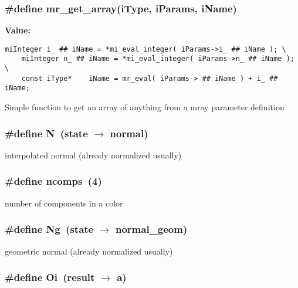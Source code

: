 \subsubsection{\setlength{\rightskip}{0pt plus 5cm}\#define mr\_\-get\_\-array(i\-Type, i\-Params, i\-Name)}\label{mrRman__macros_8h_a15}


{\bf Value:}

\footnotesize\begin{verbatim}miInteger i_ ## iName = *mi_eval_integer( iParams->i_ ## iName ); \
    miInteger n_ ## iName = *mi_eval_integer( iParams->n_ ## iName ); \
    const iType*    iName = mr_eval( iParams-> ## iName ) + i_ ## iName;
\end{verbatim}\normalsize 
Simple function to get an array of anything from a mray parameter definition 
\subsubsection{\setlength{\rightskip}{0pt plus 5cm}\#define N\ (state $\rightarrow$ normal)}\label{mrRman__macros_8h_a4}


interpolated normal (already normalized usually) 

\subsubsection{\setlength{\rightskip}{0pt plus 5cm}\#define ncomps\ (4)}\label{mrRman__macros_8h_a11}


number of components in a color 

\subsubsection{\setlength{\rightskip}{0pt plus 5cm}\#define Ng\ (state $\rightarrow$ normal\_\-geom)}\label{mrRman__macros_8h_a5}


geometric normal (already normalized usually) 

\subsubsection{\setlength{\rightskip}{0pt plus 5cm}\#define Oi\ (result $\rightarrow$ a)}\label{mrRman__macros_8h_a1}


